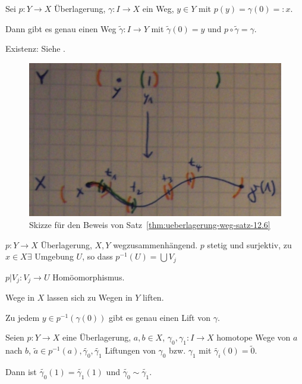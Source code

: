 \begin{satz}\label{thm:ueberlagerung-weg-satz-12.6}
    Sei $p: Y \rightarrow X$ Überlagerung, $\gamma: I \rightarrow X$
    ein Weg, $y \in Y$ mit $p(y) = \gamma(0) =: x$.

    Dann gibt es genau einen Weg $\tilde{\gamma}: I \rightarrow Y$
    mit $\tilde{\gamma}(0)=y$ und $p \circ \tilde{\gamma} = \gamma$.
\end{satz}

\begin{beweis}
Existenz: Siehe .
    \begin{figure}
        \centering
        \includegraphics[width=0.6\linewidth, keepaspectratio]{figures/todo/skizze-1.jpg}
        \caption{Skizze für den Beweis von Satz~\ref{thm:ueberlagerung-weg-satz-12.6}}
        \label{fig:satz-12.6}
    \end{figure}
\end{beweis}

$p:Y \rightarrow X$ Überlagerung, $X,Y$ wegzusammenhängend.
$p$ stetig und surjektiv, zu $x \in X \exists$ Umgebung $U$, so dass
$p^{-1}(U) = \bigcup V_j$

$p|V_j: V_j \rightarrow U$ Homöomorphismus.

\begin{bemerkung}%
    Wege in $X$ lassen sich zu Wegen in $Y$ liften.

    Zu jedem $y \in p^{-1}(\gamma(0))$ gibt es genau einen Lift von 
    $\gamma$.
\end{bemerkung}

\begin{proposition}\label{proposition:12.7}%
    Seien $p: Y \rightarrow X$ eine Überlagerung, $a,b \in X$,
    $\gamma_0, \gamma_1: I \rightarrow X$ homotope Wege von $a$ nach
    $b$, $\tilde{a} \in p^{-1}(a), \tilde{\gamma_0}, \tilde{\gamma_1}$
    Liftungen von $\gamma_0$ bzw. $\gamma_1$ mit 
    $\tilde{\gamma_i}(0) = \tilde{0}$.

    Dann ist $\tilde{\gamma_0}(1) = \tilde{\gamma_1}(1)$ und
    $\tilde{\gamma_0} \sim \tilde{\gamma_1}$.
\end{proposition}

